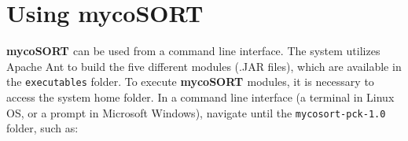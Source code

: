 \documentclass[11pt]{article}
\newcommand{\mycos}{{\bf{mycoSORT{ }}}}
\newcommand{\homefolder}{\texttt{mycosort-pck-\version{ }}}
\def\version{{\tt 1.0}}
\begin{document}
% 
% 
% 
% 


\section{Using \mycos{}}
\mycos{} can be used from a command line interface. 
The system utilizes Apache Ant to build the five different modules (.JAR files), 
which are available in the \texttt{executables} folder.
To execute \mycos{} modules, it is necessary to access the system home folder.
In a command line interface (a terminal in Linux OS, or a prompt in Microsoft Windows), 
navigate until the \homefolder{} folder, such as:
\end{document}
